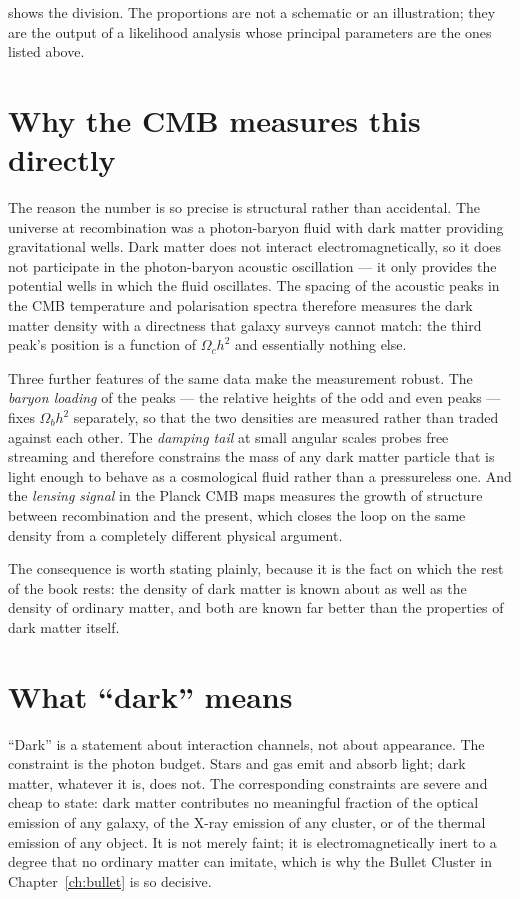  shows the division. The proportions are not a
schematic or an illustration; they are the output of a likelihood analysis
whose principal parameters are the ones listed above.

\section{Why the CMB measures this directly}The reason the number is so precise is structural rather than
accidental. The universe at recombination was a photon-baryon fluid with
dark matter providing gravitational wells. Dark matter does not interact
electromagnetically, so it does not participate in the photon-baryon acoustic
oscillation --- it only provides the potential wells in which the fluid
oscillates. The spacing of the acoustic peaks in the CMB temperature and
polarisation spectra therefore measures the dark matter density with a
directness that galaxy surveys cannot match: the third peak's position is a
function of $\Omega_c h^2$ and essentially nothing else.

Three further features of the same data make the measurement robust. The
\emph{baryon loading} of the peaks --- the relative heights of the odd and
even peaks --- fixes $\Omega_b h^2$ separately, so that the two densities are
measured rather than traded against each other. The \emph{damping tail} at
small angular scales probes free streaming and therefore constrains the
mass of any dark matter particle that is light enough to behave as a
cosmological fluid rather than a pressureless one. And the \emph{lensing
signal} in the Planck CMB maps measures the growth of structure between
recombination and the present, which closes the loop on the same density
from a completely different physical argument.

The consequence is worth stating plainly, because it is the fact on which the
rest of the book rests: the density of dark matter is known about as well as
the density of ordinary matter, and both are known far better than the
properties of dark matter itself.

\section{What ``dark'' means}``Dark'' is a statement about interaction channels, not about
appearance. The constraint is the photon budget. Stars and gas emit and
absorb light; dark matter, whatever it is, does not. The corresponding
constraints are severe and cheap to state: dark matter contributes no
meaningful fraction of the optical emission of any galaxy, of the X-ray
emission of any cluster, or of the thermal emission of any object. It is not
merely faint; it is electromagnetically inert to a degree that no ordinary
matter can imitate, which is why the Bullet Cluster in Chapter~\ref{ch:bullet}
is so decisive.

